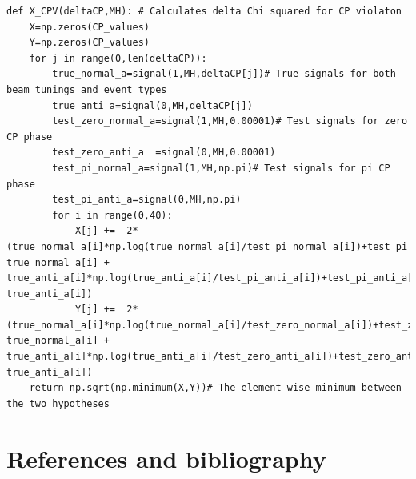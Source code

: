 \documentclass[12pt]{article}
\begin{document}
\begin{lstlisting}
def X_CPV(deltaCP,MH): # Calculates delta Chi squared for CP violaton
	X=np.zeros(CP_values)
	Y=np.zeros(CP_values)
	for j in range(0,len(deltaCP)):
		true_normal_a=signal(1,MH,deltaCP[j])# True signals for both beam tunings and event types
		true_anti_a=signal(0,MH,deltaCP[j])
		test_zero_normal_a=signal(1,MH,0.00001)# Test signals for zero CP phase
		test_zero_anti_a  =signal(0,MH,0.00001)
		test_pi_normal_a=signal(1,MH,np.pi)# Test signals for pi CP phase
		test_pi_anti_a=signal(0,MH,np.pi)
		for i in range(0,40):
			X[j] +=  2*(true_normal_a[i]*np.log(true_normal_a[i]/test_pi_normal_a[i])+test_pi_normal_a[i]-true_normal_a[i] + true_anti_a[i]*np.log(true_anti_a[i]/test_pi_anti_a[i])+test_pi_anti_a[i]-true_anti_a[i])
			Y[j] +=  2*(true_normal_a[i]*np.log(true_normal_a[i]/test_zero_normal_a[i])+test_zero_normal_a[i]-true_normal_a[i] + true_anti_a[i]*np.log(true_anti_a[i]/test_zero_anti_a[i])+test_zero_anti_a[i]-true_anti_a[i])
	return np.sqrt(np.minimum(X,Y))# The element-wise minimum between the two hypotheses
\end{lstlisting}
\newpage
\section{References and bibliography}
 

\end{document}
